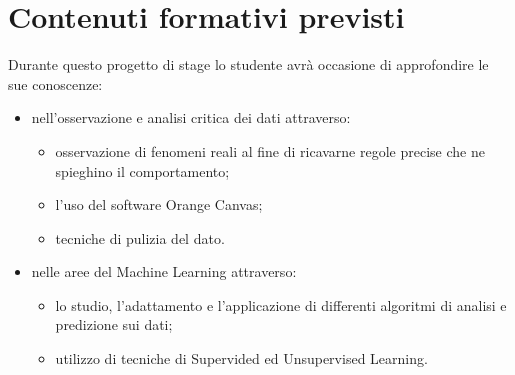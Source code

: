 \section{Contenuti formativi previsti}
Durante questo progetto di stage lo studente avrà occasione di approfondire le sue conoscenze:
\begin{itemize}
\item nell'osservazione e analisi critica dei dati attraverso:
	\begin{itemize}
	\item osservazione di fenomeni reali al fine di ricavarne regole precise che ne spieghino il comportamento;
	\item l'uso del software Orange Canvas;
	\item tecniche di pulizia del dato.
	\end{itemize}
\item nelle aree del Machine Learning attraverso:
	\begin{itemize}
	\item lo studio, l'adattamento e l'applicazione di differenti algoritmi di analisi e predizione sui dati;
	\item utilizzo di tecniche di Supervided ed Unsupervised Learning.
	\end{itemize}
\end{itemize} 





 









